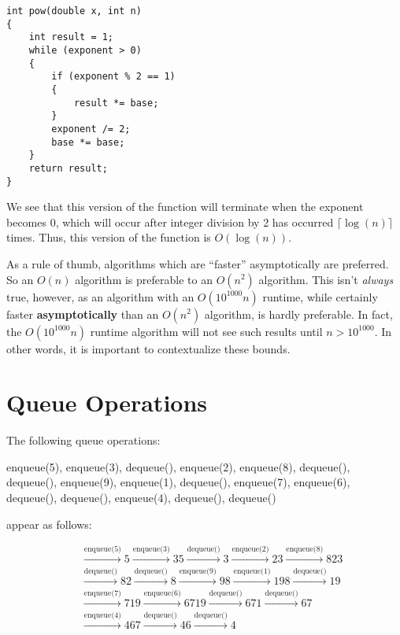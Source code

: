 \documentclass[a4paper]{article}
\begin{document}
\begin{verbatim}
int pow(double x, int n)
{
	int result = 1;
	while (exponent > 0)
	{
		if (exponent % 2 == 1)
		{
			result *= base;
		}
		exponent /= 2;
		base *= base;
	}
	return result;
}
\end{verbatim}

We see that this version of the function will terminate when the exponent becomes 0, which will occur after integer division by 2 has occurred $\lceil\log(n)\rceil$ times. Thus, this version of the function is $O(\log(n))$.

As a rule of thumb, algorithms which are ``faster'' asymptotically are preferred. So an $O(n)$ algorithm is preferable to an $O(n^2)$ algorithm. This isn't \textit{always} true, however, as an algorithm with an $O(10^{1000}n)$ runtime, while certainly faster \textbf{asymptotically} than an $O(n^2)$ algorithm, is hardly preferable. In fact, the $O(10^{1000}n)$ runtime algorithm will not see such results until $n>10^{1000}$. In other words, it is important to contextualize these bounds.


\section{Queue Operations}
The following queue operations:

enqueue(5), enqueue(3), dequeue(), enqueue(2), enqueue(8), dequeue(), dequeue(), enqueue(9), enqueue(1), dequeue(), enqueue(7), enqueue(6), dequeue(), dequeue(), enqueue(4), dequeue(), dequeue()

appear as follows:

\begin{align*}
\boxed{\phantom{5}}&\xrightarrow{\text{enqueue(5)}}\boxed{5}\xrightarrow{\text{enqueue(3)}}\boxed{3}\boxed{5}\xrightarrow{\text{dequeue()}}\boxed{3}\xrightarrow{\text{enqueue(2)}}\boxed{2}\boxed{3}\xrightarrow{\text{enqueue(8)}}\boxed{8}\boxed{2}\boxed{3}\\&\xrightarrow{\text{dequeue()}}\boxed{8}\boxed{2}\xrightarrow{\text{dequeue()}}\boxed{8}\xrightarrow{\text{enqueue(9)}}\boxed{9}\boxed{8}\xrightarrow{\text{enqueue(1)}}\boxed{1}\boxed{9}\boxed{8}\xrightarrow{\text{dequeue()}}\boxed{1}\boxed{9}\\&\xrightarrow{\text{enqueue(7)}}\boxed{7}\boxed{1}\boxed{9}\xrightarrow{\text{enqueue(6)}}\boxed{6}\boxed{7}\boxed{1}\boxed{9}\xrightarrow{\text{dequeue()}}\boxed{6}\boxed{7}\boxed{1}\xrightarrow{\text{dequeue()}}\boxed{6}\boxed{7}\\&\xrightarrow{\text{enqueue(4)}}\boxed{4}\boxed{6}\boxed{7}\xrightarrow{\text{dequeue()}}\boxed{4}\boxed{6}\xrightarrow{\text{dequeue()}}\boxed{4}
\end{align*}
\end{document}
